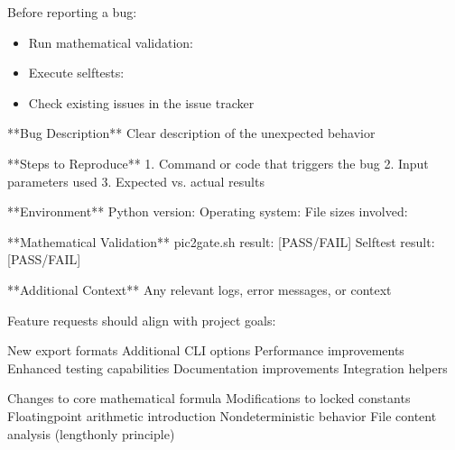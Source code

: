 \documentclass[letterpaper,10pt,english]{sphinxmanual}
\begin{document}
\sphinxAtStartPar
Before reporting a bug:
\begin{itemize}
\item {} 
\sphinxAtStartPar
Run mathematical validation: 

\item {} 
\sphinxAtStartPar
Execute self\sphinxhyphen{}tests: 

\item {} 
\sphinxAtStartPar
Check existing issues in the issue tracker

\end{itemize}

\sphinxAtStartPar
{}

\begin{sphinxVerbatim}[commandchars=\\\{\}]
**Bug Description**
Clear description of the unexpected behavior

**Steps to Reproduce**
1. Command or code that triggers the bug
2. Input parameters used
3. Expected vs. actual results

**Environment**
\PYGZhy{} Python version:
\PYGZhy{} Operating system:
\PYGZhy{} File sizes involved:

**Mathematical Validation**
\PYGZhy{} pic2\PYGZus{}gate.sh result: [PASS/FAIL]
\PYGZhy{} Self\PYGZhy{}test result: [PASS/FAIL]

**Additional Context**
Any relevant logs, error messages, or context
\end{sphinxVerbatim}

\sphinxAtStartPar
{}

\sphinxAtStartPar
Feature requests should align with project goals:

\sphinxAtStartPar
{}
\sphinxhyphen{} New export formats
\sphinxhyphen{} Additional CLI options
\sphinxhyphen{} Performance improvements
\sphinxhyphen{} Enhanced testing capabilities
\sphinxhyphen{} Documentation improvements
\sphinxhyphen{} Integration helpers

\sphinxAtStartPar
{}
\sphinxhyphen{} Changes to core mathematical formula
\sphinxhyphen{} Modifications to locked constants
\sphinxhyphen{} Floating\sphinxhyphen{}point arithmetic introduction
\sphinxhyphen{} Non\sphinxhyphen{}deterministic behavior
\sphinxhyphen{} File content analysis (length\sphinxhyphen{}only principle)
\end{document}
